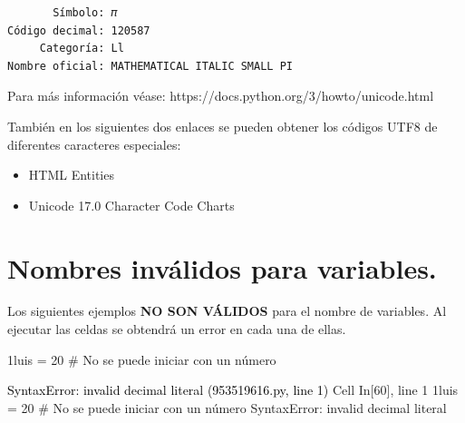 \documentclass[
  spanish,
  letterpaper,
]{scrbook}
\newenvironment{Shaded}{\begin{snugshade}}{\end{snugshade}}
\newcommand{\CommentTok}[1]{\textcolor[rgb]{0.37,0.37,0.37}{#1}}
\newcommand{\DecValTok}[1]{\textcolor[rgb]{0.68,0.00,0.00}{#1}}
\newcommand{\ErrorTok}[1]{\textcolor[rgb]{0.68,0.00,0.00}{#1}}
\newcommand{\OperatorTok}[1]{\textcolor[rgb]{0.37,0.37,0.37}{#1}}
\providecommand{\tightlist}{%
  \setlength{\itemsep}{0pt}\setlength{\parskip}{0pt}}
\theoremstyle{definition}
\theoremstyle{remark}
\begin{document}
\begin{verbatim}
       Símbolo: 𝜋
Código decimal: 120587
     Categoría: Ll
Nombre oficial: MATHEMATICAL ITALIC SMALL PI
\end{verbatim}

Para más información véase: https://docs.python.org/3/howto/unicode.html

También en los siguientes dos enlaces se pueden obtener los códigos UTF8
de diferentes caracteres especiales:

\begin{itemize}
\tightlist
\item
  HTML Entities
\item
  Unicode 17.0 Character Code Charts
\end{itemize}

\section{Nombres inválidos para
variables.}\label{sec-a-nombres_invalidos}

Los siguientes ejemplos \textbf{NO SON VÁLIDOS} para el nombre de
variables. Al ejecutar las celdas se obtendrá un error en cada una de
ellas.

\begin{Shaded}
\begin{Highlighting}[]
\DecValTok{1l}\ErrorTok{uis} \OperatorTok{=} \DecValTok{20}      \CommentTok{\# No se puede iniciar con un número}
\end{Highlighting}
\end{Shaded}

\begin{Highlighting}
\textcolor{black}{SyntaxError: invalid decimal literal (953519616.py, line 1)}
\textcolor{black}{  }\textcolor{QuartoInternalColor3}{Cell}\textcolor{QuartoInternalColor2}{}\textcolor{QuartoInternalColor3}{ }\textcolor{QuartoInternalColor2}{}\textcolor{QuartoInternalColor4}{In[60]}\textcolor{QuartoInternalColor2}{}\textcolor{QuartoInternalColor4}{, line 1}\textcolor{QuartoInternalColor2}{}
\textcolor{QuartoInternalColor2}{}\textcolor{QuartoInternalColor1}{    }\textcolor{QuartoInternalColor2}{}\textcolor{QuartoInternalColor1}{1luis = 20      # No se puede iniciar con un número}\textcolor{QuartoInternalColor2}{}
\textcolor{QuartoInternalColor2}{    \textasciicaret{}}
\textcolor{QuartoInternalColor2}{}\textcolor{QuartoInternalColor1}{SyntaxError}\textcolor{QuartoInternalColor2}{}\textcolor{QuartoInternalColor1}{:}\textcolor{QuartoInternalColor2}{ invalid decimal literal}
\end{Highlighting}
\end{document}
